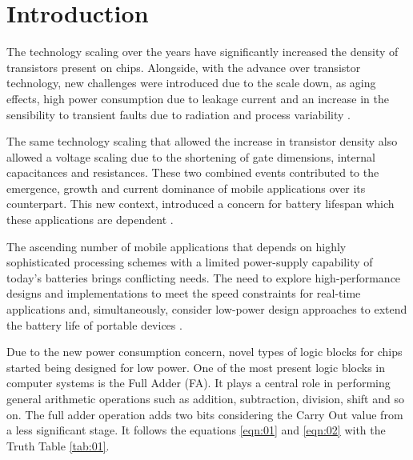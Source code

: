 \documentclass[ecp,tc, english]{iiufrgs}
\begin{document}

\listoffigures

\listoftables

\tableofcontents


\chapter{Introduction}
The technology scaling over the years have significantly increased the density of transistors present on chips. Alongside, with the advance over transistor technology, new challenges were introduced due to the scale down, as aging effects, high power consumption due to leakage current and an increase in the sensibility to transient faults due to radiation and process variability \cite{abbas:15}.

The same technology scaling that allowed the increase in transistor density also allowed a voltage scaling due to the shortening of gate dimensions, internal capacitances and resistances. These two combined events contributed to the emergence, growth and current dominance of mobile applications over its counterpart. This new context, introduced a concern for battery lifespan which these applications are dependent \cite{islam:10}. 

The ascending number of mobile applications that depends on highly sophisticated processing schemes with a limited power-supply capability of today’s batteries brings conflicting needs. The need to explore high-performance designs and implementations to meet the speed constraints for real-time applications and, simultaneously, consider low-power design approaches to extend the battery life of portable devices \cite{shoarinejad:03}. 

Due to the new power consumption concern, novel types of logic blocks for chips started being designed for low power. One of the most present logic blocks in computer systems is the Full Adder (FA). It plays a central role in performing general arithmetic operations such as addition, subtraction, division, shift and so on. The full adder operation adds two bits considering the Carry Out value from a less significant stage. It follows the equations \ref{eqn:01} and \ref{eqn:02} with the Truth Table \ref{tab:01}.
\end{document}
